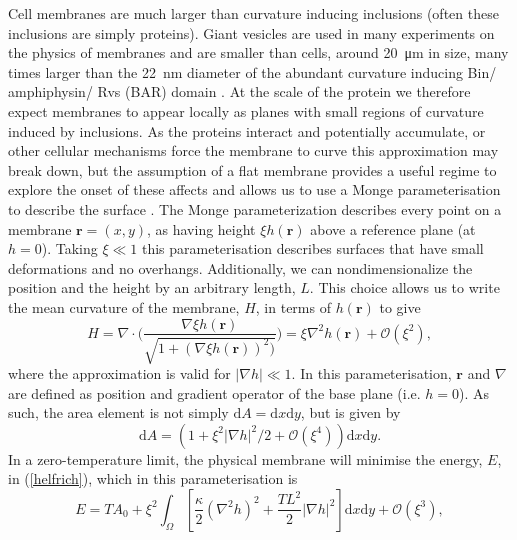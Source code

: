 Cell membranes are much larger than curvature inducing inclusions (often these inclusions are simply proteins). Giant vesicles are used in many experiments on the physics of membranes and are smaller than cells, around \SI{20}{\micro\metre} in size,\cite{ramaswamy_nonequilibrium_2000} many times larger than the \SI{22}{\nano\metre} diameter of the abundant curvature inducing Bin/ amphiphysin/ Rvs (BAR) domain \cite{peter_bar_2004}. At the scale of the protein we therefore expect membranes to appear locally as planes with small regions of curvature induced by inclusions. As the proteins interact and potentially accumulate, or other cellular mechanisms force the membrane to curve this approximation may break down, but the assumption of a flat membrane provides a useful regime to explore the onset of these affects and allows us to use a Monge parameterisation to describe the surface \cite{deserno_fluid_nodate}. The Monge parameterization describes every point on a membrane $\textbf{r}=(x,y)$, as having height $\xi h(\textbf{r})$ above a reference plane (at $h=0$). Taking $\xi \ll 1$ this parameterisation describes surfaces that have small deformations and no overhangs. Additionally, we can nondimensionalize the position and the height by an arbitrary length, $L$. This choice allows us to write the mean curvature of the membrane, $H$, in terms of $h(\textbf{r})$ to give
\begin{equation}
    H = \nabla\cdot\Bigg(\frac{\nabla \xi h(\textbf{r})}{\sqrt{1+(\nabla \xi h(\textbf{r}))^2)}}\Bigg) = \xi \nabla^2h(\textbf{r}) + \mathcal{O}(\xi^2),
\end{equation}
where the approximation is valid for $|\nabla h| \ll 1$. In this parameterisation, $\textbf{r}$ and $\nabla$ are defined as position and gradient operator of the base plane (i.e. $h=0$). As such, the area element is not simply $\text{d}A = \text{d}x\text{d}y$, but is given by
\begin{equation}
    \text{d}A = (1 + \xi^2|\nabla h|^2/2 + \mathcal{O}(\xi^4))\text{d}x\text{d}y .
\end{equation}
In a zero-temperature limit, the physical membrane will minimise the energy, $E$, in (\ref{helfrich}), which in this parameterisation is
\begin{equation}
    E= TA_0 + \xi^2\int_{\Omega}\left[\frac{\kappa}{2}(\nabla^2 h)^2 + \frac{T L^2}{2}|\nabla h|^2\right] \text{d}x\text{d}y + \mathcal{O}(\xi^3),
    \label{eq:efull}
\end{equation}
